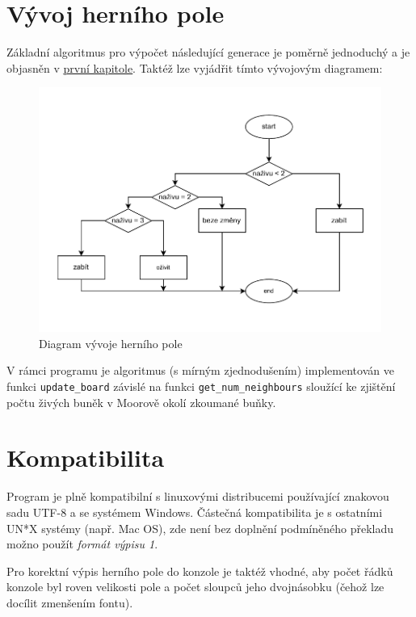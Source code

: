 \section{Vývoj herního pole}
\label{sec:vyvoj}
Základní algoritmus pro výpočet následující generace je poměrně jednoduchý a je objasněn v \underline{\hyperref[sec:gol]{první kapitole}}. Taktéž lze vyjádřit tímto vývojovým diagramem:
\begin{figure}[H]
	\includegraphics[width=\textwidth]{images/diagram}
	\caption{Diagram vývoje herního pole}
	\label{img:2}
\end{figure}

V rámci programu je algoritmus (s mírným zjednodušením) implementován ve funkci \texttt{update{\_}board} závislé na funkci \texttt{get{\_}num{\_}neighbours} sloužící ke zjištění počtu živých buněk v Moorově okolí zkoumané buňky.

\section{Kompatibilita}
Program je plně kompatibilní s linuxovými distribucemi používající znakovou sadu UTF-8 a se systémem Windows. Částečná kompatibilita je s ostatními UN*X systémy (např. Mac OS), zde není bez doplnění podmíněného překladu možno použít \textit{formát výpisu 1}.

Pro korektní výpis herního pole do konzole je taktéž vhodné, aby počet řádků konzole byl roven velikosti pole a počet sloupců jeho dvojnásobku (čehož lze docílit zmenšením fontu).


